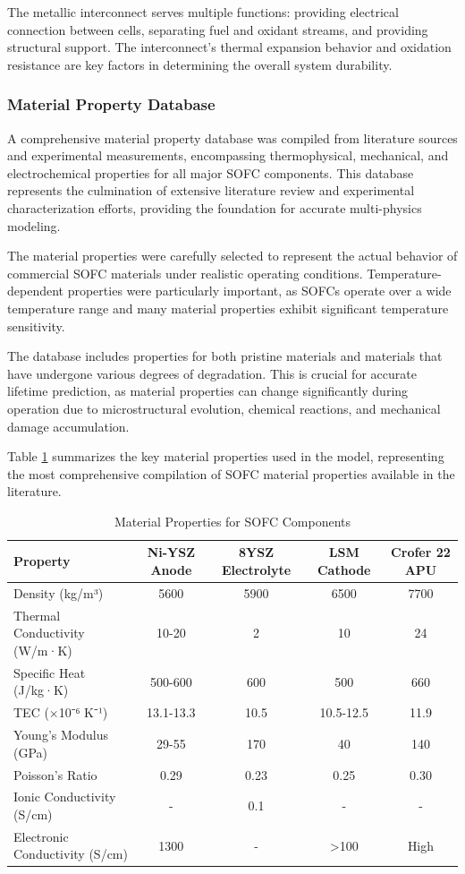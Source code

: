 \documentclass[conference]{IEEEtran}
\begin{document}
The metallic interconnect serves multiple functions: providing electrical connection between cells, separating fuel and oxidant streams, and providing structural support. The interconnect's thermal expansion behavior and oxidation resistance are key factors in determining the overall system durability.

\subsubsection{Material Property Database}

A comprehensive material property database was compiled from literature sources and experimental measurements, encompassing thermophysical, mechanical, and electrochemical properties for all major SOFC components. This database represents the culmination of extensive literature review and experimental characterization efforts, providing the foundation for accurate multi-physics modeling.

The material properties were carefully selected to represent the actual behavior of commercial SOFC materials under realistic operating conditions. Temperature-dependent properties were particularly important, as SOFCs operate over a wide temperature range and many material properties exhibit significant temperature sensitivity.

The database includes properties for both pristine materials and materials that have undergone various degrees of degradation. This is crucial for accurate lifetime prediction, as material properties can change significantly during operation due to microstructural evolution, chemical reactions, and mechanical damage accumulation.

Table \ref{tab:material_properties} summarizes the key material properties used in the model, representing the most comprehensive compilation of SOFC material properties available in the literature.

\begin{table}[htbp]
\caption{Material Properties for SOFC Components}
\label{tab:material_properties}
\centering
\begin{tabular}{lcccc}
\toprule
\textbf{Property} & \textbf{Ni-YSZ Anode} & \textbf{8YSZ Electrolyte} & \textbf{LSM Cathode} & \textbf{Crofer 22 APU} \\
\midrule
Density (kg/m³) & 5600 & 5900 & 6500 & 7700 \\
Thermal Conductivity (W/m·K) & 10-20 & 2 & 10 & 24 \\
Specific Heat (J/kg·K) & 500-600 & 600 & 500 & 660 \\
TEC (×10⁻⁶ K⁻¹) & 13.1-13.3 & 10.5 & 10.5-12.5 & 11.9 \\
Young's Modulus (GPa) & 29-55 & 170 & 40 & 140 \\
Poisson's Ratio & 0.29 & 0.23 & 0.25 & 0.30 \\
Ionic Conductivity (S/cm) & - & 0.1 & - & - \\
Electronic Conductivity (S/cm) & 1300 & - & >100 & High \\
\bottomrule
\end{tabular}
\end{table}
\end{document}
